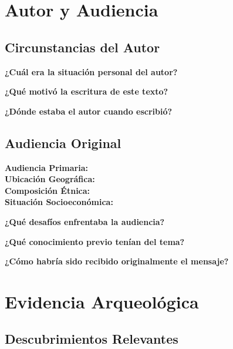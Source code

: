 \documentclass[11pt,a4paper]{article}
\begin{document}
\section{Autor y Audiencia}

\subsection{Circunstancias del Autor}

\textbf{¿Cuál era la situación personal del autor?}
\vspace{2cm}

\textbf{¿Qué motivó la escritura de este texto?}
\vspace{2cm}

\textbf{¿Dónde estaba el autor cuando escribió?}
\vspace{2cm}

\subsection{Audiencia Original}

\begin{historybox}
\textbf{Audiencia Primaria:} \hspace{8cm}\\[0.5cm]
\textbf{Ubicación Geográfica:} \hspace{8cm}\\[0.5cm]
\textbf{Composición Étnica:} \hspace{8cm}\\[0.5cm]
\textbf{Situación Socioeconómica:} \hspace{8cm}
\end{historybox}

\textbf{¿Qué desafíos enfrentaba la audiencia?}
\vspace{2cm}

\textbf{¿Qué conocimiento previo tenían del tema?}
\vspace{2cm}

\textbf{¿Cómo habría sido recibido originalmente el mensaje?}
\vspace{2cm}

\newpage

\section{Evidencia Arqueológica}

\subsection{Descubrimientos Relevantes}
\end{document}
